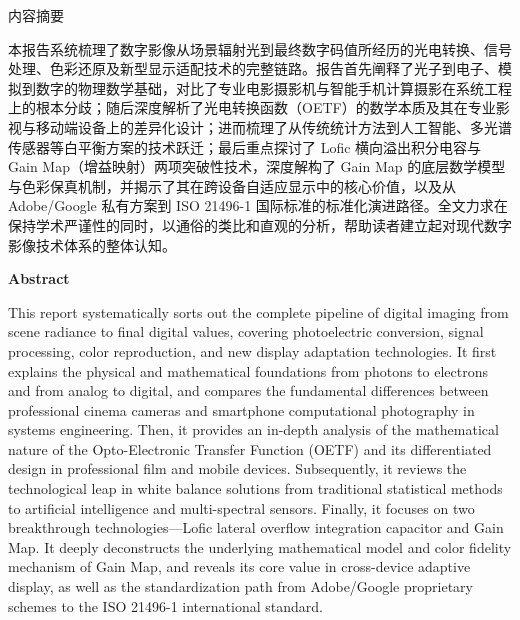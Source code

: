 \documentclass[12pt, a4paper]{ctexart}
\begin{document}
{} %
\begin{center}
    {\heiti{} 内容摘要} %
\end{center}
\vspace{1em}
{\fangsong{} %
\setlength{\parindent}{2em} %
本报告系统梳理了数字影像从场景辐射光到最终数字码值所经历的光电转换、信号处理、色彩还原及新型显示适配技术的完整链路。报告首先阐释了光子到电子、模拟到数字的物理数学基础，对比了专业电影摄影机与智能手机计算摄影在系统工程上的根本分歧；随后深度解析了光电转换函数（OETF）的数学本质及其在专业影视与移动端设备上的差异化设计；进而梳理了从传统统计方法到人工智能、多光谱传感器等白平衡方案的技术跃迁；最后重点探讨了 Lofic 横向溢出积分电容与 Gain Map（增益映射）两项突破性技术，深度解构了 Gain Map 的底层数学模型与色彩保真机制，并揭示了其在跨设备自适应显示中的核心价值，以及从 Adobe/Google 私有方案到 ISO 21496-1 国际标准的标准化演进路径。全文力求在保持学术严谨性的同时，以通俗的类比和直观的分析，帮助读者建立起对现代数字影像技术体系的整体认知。\par
}

\vfill

\newpage
{}
{} %
\begin{center}
    {\textbf{Abstract}} %
\end{center}
\vspace{1em}
{ %
\setlength{\parindent}{2em}
This report systematically sorts out the complete pipeline of digital imaging from scene radiance to final digital values, covering photoelectric conversion, signal processing, color reproduction, and new display adaptation technologies. It first explains the physical and mathematical foundations from photons to electrons and from analog to digital, and compares the fundamental differences between professional cinema cameras and smartphone computational photography in systems engineering. Then, it provides an in-depth analysis of the mathematical nature of the Opto-Electronic Transfer Function (OETF) and its differentiated design in professional film and mobile devices. Subsequently, it reviews the technological leap in white balance solutions from traditional statistical methods to artificial intelligence and multi-spectral sensors. Finally, it focuses on two breakthrough technologies—Lofic lateral overflow integration capacitor and Gain Map. It deeply deconstructs the underlying mathematical model and color fidelity mechanism of Gain Map, and reveals its core value in cross-device adaptive display, as well as the standardization path from Adobe/Google proprietary schemes to the ISO 21496-1 international standard.\par
}
\end{document}
